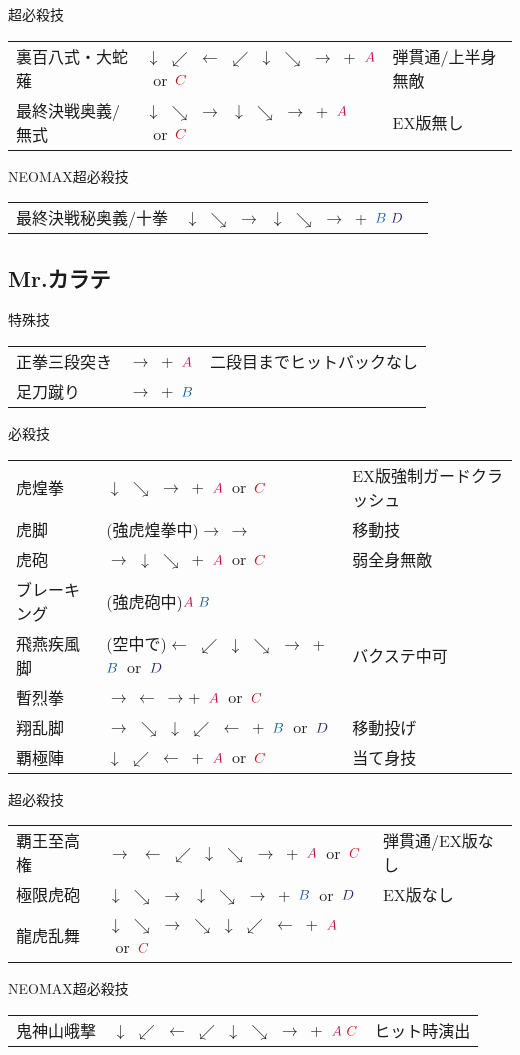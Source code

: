 \documentclass[a4j,11pt]{jarticle}
\def\A{\textcolor{Acolor}{A}}
\def\C{\textcolor{Ccolor}{C}}
\def\B{\textcolor{Bcolor}{B}}
\def\D{\textcolor{Dcolor}{D}}
\def\zanretu{$\rightarrow\ \leftarrow\ \rightarrow$}
\def\hado{$\downarrow$ $\searrow$ $\rightarrow$}%
\def\tatsu{$\downarrow$ $\swarrow$ $\leftarrow$}%
\def\syoryu{$\rightarrow$ $\downarrow$ $\searrow$}%
\def\yoga{$\leftarrow$ $\swarrow$ $\downarrow$ $\searrow$ $\rightarrow$}%
\def\gyakuyoga{$\rightarrow$ $\searrow$ $\downarrow$ $\swarrow$ $\leftarrow$}%
\def\ryuko{$\downarrow$ $\searrow$ $\rightarrow$ $\searrow$ $\downarrow$ $\swarrow$ $\leftarrow$}%
\def\orochi{$\downarrow$ $\swarrow$ $\leftarrow$ $\swarrow$ $\downarrow$ $\searrow$ $\rightarrow$}%
\begin{document}
\begin{itembox}[l]{超必殺技}
\begin{tabular}{lll}
裏百八式・大蛇薙&\orochi\ +\ $\A$\ or\ $\C$&弾貫通/上半身無敵\\%
最終決戦奥義/無式&\hado\ \hado\ +\ $\A$\ or\ $\C$&EX版無し%
\end{tabular}
\end{itembox}
\begin{itembox}[l]{NEOMAX超必殺技}
\begin{tabular}{lll}
最終決戦秘奥義/十拳&\hado\ \hado\ +\ $\B\ \D$&%
\end{tabular}
\end{itembox}
\newpage
\subsection{Mr.カラテ}
\begin{itembox}[l]{特殊技}
\begin{tabular}{lll}
正拳三段突き&$\rightarrow$\ +\ $\A$&二段目までヒットバックなし\\%
足刀蹴り&$\rightarrow$\ +\ $\B$&%
\end{tabular}
\end{itembox}
\begin{itembox}[l]{必殺技}
\begin{tabular}{lll}
虎煌拳&\hado\ +\ $\A$\ or\ $\C$&EX版強制ガードクラッシュ\\%
虎脚&(強虎煌拳中)$\rightarrow\ \rightarrow$&移動技\\%
虎砲&\syoryu\ +\ $\A$\ or\ $\C$&弱全身無敵\\%
ブレーキング&(強虎砲中)$\A\ \B$&\\%
飛燕疾風脚&(空中で)\yoga\ +\ $\B$\ or\ $\D$&バクステ中可\\%
暫烈拳&\zanretu +\ $\A$\ or\ $\C$&\\%
翔乱脚&\gyakuyoga\ +\ $\B$\ or\ $\D$&移動投げ\\%
覇極陣&\tatsu\ +\ $\A$\ or\ $\C$&当て身技%
\end{tabular}
\end{itembox}
\begin{itembox}[l]{超必殺技}
\begin{tabular}{lll}
覇王至高権&$\rightarrow$\ \yoga\ +\ $\A$\ or\ $\C$&弾貫通/EX版なし\\%
極限虎砲&\hado\ \hado\ +\ $\B$\ or\ $\D$&EX版なし\\%
龍虎乱舞&\ryuko\ +\ $\A$\ or\ $\C$&%
\end{tabular}
\end{itembox}
\begin{itembox}[l]{NEOMAX超必殺技}
\begin{tabular}{lll}
鬼神山峨撃&\orochi\ +\ $\A\ \C$&ヒット時演出%
\end{tabular}
\end{itembox}
\newpage
\end{document}
